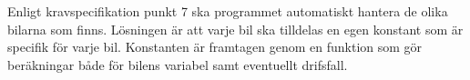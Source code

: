 Enligt kravspecifikation punkt 7 ska programmet automatiskt hantera de olika
bilarna som finns. Lösningen är att varje bil ska tilldelas en egen konstant
som är specifik för varje bil. Konstanten är framtagen genom en funktion som
gör beräkningar både för bilens variabel samt eventuellt drifsfall. 
